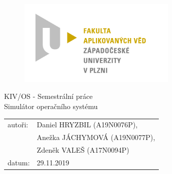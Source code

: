 \documentclass[11pt,a4paper]{scrartcl}
\begin{document}
	\begin{figure}[h!]
		\centering
		\includegraphics[bb= 0 0 820 445 , width=75mm]{favlogo.jpg}
	\end{figure}
	
	\vspace{5cm}
	
	{\centering
		{\huge KIV/OS - Semestrální práce}\\[1em]
		{\large Simulátor operačního systému}\\[7,5cm]
	}
	
	\begin{center}
		\begin{tabular}{l l}
		autoři: & Daniel HRYZBIL (A19N0076P), \\
		& Anežka JÁCHYMOVÁ (A19N0077P), \\
		& Zdeněk VALEŠ (A17N0094P) \\
		datum: & 29.11.2019 \\
		\end{tabular}
	\end{center}
	
	\thispagestyle{empty}
	\newpage
	
\end{document}
